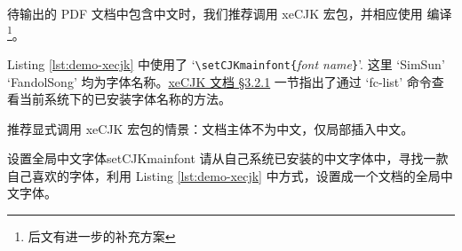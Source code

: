 待输出的 PDF 文档中包含中文时，我们推荐调用 xeCJK 宏包，并相应使用  编译\footnote{后文有进一步的补充方案}。



% 
% 

Listing \ref{lst:demo-xecjk} 中使用了 `\verb|\setCJKmainfont{|\textit{font name}\verb|}|'. 这里 `SimSun' `FandolSong' 均为字体名称。\href{http://mirrors.ctan.org/macros/xetex/latex/xecjk/xeCJK.pdf#6}{xeCJK 文档 \S 3.2.1} 一节指出了通过 `fc-list' 命令查看当前系统下的已安装字体名称的方法。

推荐显式调用 xeCJK 宏包的情景：文档主体不为中文，仅局部插入中文。

\begin{Ex}{设置全局中文字体}{setCJKmainfont}
请从自己系统已安装的中文字体中，寻找一款自己喜欢的字体，利用 Listing \ref{lst:demo-xecjk} 中方式，设置成一个文档的全局中文字体。
\end{Ex}